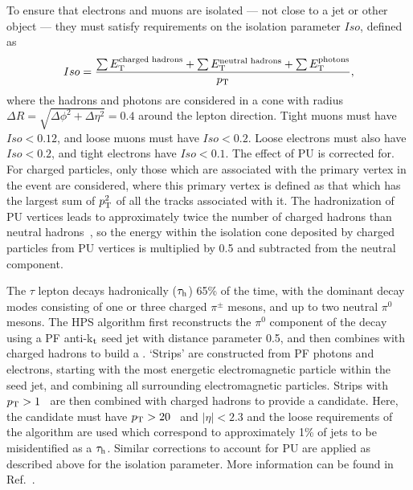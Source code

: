 To ensure that electrons and muons are isolated --- not close to a jet or other object --- they must satisfy requirements on the isolation parameter $Iso$, defined as
\begin{equation}
Iso = \frac{\sum{\ET^{\text{charged hadrons}}}+ \sum{\ET^{\text{neutral hadrons}}}+ \sum{\ET^{\text{photons}}} }{\pt},
\end{equation} 
where the hadrons and photons are considered in a cone with radius $\Delta R=\sqrt{\Delta \phi ^{2} + \Delta \eta ^{2}}=0.4$ around the lepton direction.
Tight muons must have $Iso<0.12$, and loose muons must have $Iso<0.2$. 
Loose electrons must also have $Iso<0.2$, and tight electrons have $Iso<0.1$.
The effect of \ac{PU} is corrected for. 
For charged particles, only those which are associated with the primary vertex in the event are considered, where this primary vertex is defined as that which has the largest sum of $p_{\text{T}}^{2}$ of all the tracks associated with it. 
The hadronization of \ac{PU} vertices leads to approximately twice 
the number of charged hadrons than neutral hadrons~\cite{deltabeta_htautau7tev}, 
so the energy within the isolation cone deposited by charged particles 
from \ac{PU} vertices is multiplied by 0.5 and subtracted from the neutral component.


The $\tau$ lepton decays hadronically ($\tau_\mathrm{h}$) 65\% of the time, with the dominant decay modes consisting of one or three charged $\pi^{\pm}$ mesons, and up to two neutral $\pi^{0}$ mesons.
The \ac{HPS} algorithm first reconstructs the $\pi^{0}$ component of the \tauh decay using a \ac{PF} anti-k$_{\rm t}$ seed jet with distance parameter 0.5, and then combines with charged hadrons to build a \tauh. 
`Strips' are constructed from \ac{PF} photons and electrons, starting with the most energetic electromagnetic particle within the seed jet, and combining all surrounding electromagnetic particles.
Strips with $p_{\text{T}} > 1$~\GeV{} are then combined with charged hadrons to provide a \tauh candidate. 
Here, the candidate must have $p_{\text{T}} > 20$~\GeV{} and $|\eta| < 2.3$ and the loose requirements of the algorithm are used which correspond to approximately 1\% of jets to be misidentified as a $\tau_\mathrm{h}$.
Similar corrections to account for \ac{PU} are applied as described above for the isolation parameter. 
More information can be found in Ref.~\cite{bib:HPStaus}. 



